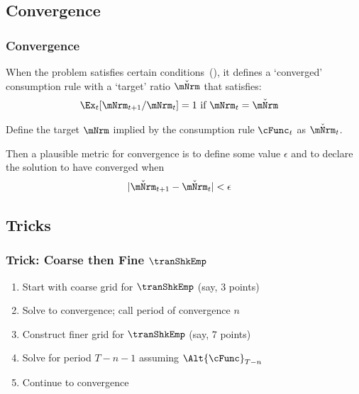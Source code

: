 \documentclass{beamer}
\begin{document}
\subsection{Convergence}
\begin{frame}
\frametitle{Convergence}

When the problem satisfies certain conditions~(\cite{BufferStockTheory}),
it defines a `converged' consumption rule with a `target' ratio $\check{\mNrm}$
that satisfies:
\begin{equation}\begin{gathered}\begin{aligned}
  \Ex_{t}[\mNrm_{t+1}/\mNrm_{t}]  & = 1 \text{~if $\mNrm_{t} = \check{\mNrm}$}
\end{aligned}\end{gathered}\end{equation}

\pause 

Define the target $\mNrm$ implied by the consumption rule $\cFunc_{t}$ as $\check{\mNrm}_{t}$.

\medskip\pause
Then a plausible metric for convergence is to define some value $\epsilon$ and to declare
the solution to have converged when
\begin{equation}\begin{gathered}\begin{aligned}
  |\check{\mNrm}_{t+1}-\check{\mNrm}_{t}|  & < \epsilon
\end{aligned}\end{gathered}\end{equation}

\end{frame}

\subsection{Tricks}
\begin{frame}
\frametitle{Trick: Coarse then Fine $\tranShkEmp$}

\begin{enumerate}
\item Start with coarse grid for $\tranShkEmp$ (say, 3 points)
\item Solve to convergence; call period of convergence $n$
\item Construct finer grid for $\tranShkEmp$ (say, 7 points)
\item Solve for period $T-n-1$ assuming $\Alt{\cFunc}_{T-n}$ 
\item Continue to convergence
\end{enumerate}

\end{frame}
\end{document}
